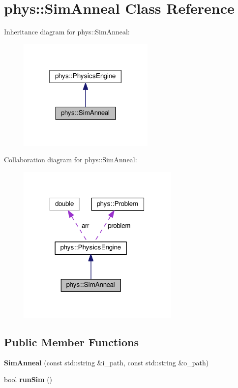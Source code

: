 \hypertarget{classphys_1_1SimAnneal}{}\section{phys\+:\+:Sim\+Anneal Class Reference}
\label{classphys_1_1SimAnneal}


Inheritance diagram for phys\+:\+:Sim\+Anneal\+:
\nopagebreak
\begin{figure}[H]
\begin{center}
\leavevmode
\includegraphics[width=189pt]{classphys_1_1SimAnneal__inherit__graph}
\end{center}
\end{figure}


Collaboration diagram for phys\+:\+:Sim\+Anneal\+:
\nopagebreak
\begin{figure}[H]
\begin{center}
\leavevmode
\includegraphics[width=224pt]{classphys_1_1SimAnneal__coll__graph}
\end{center}
\end{figure}
\subsection*{Public Member Functions}
\begin{DoxyCompactItemize}
\item 
{\bfseries Sim\+Anneal} (const std\+::string \&i\+\_\+path, const std\+::string \&o\+\_\+path)\hypertarget{classphys_1_1SimAnneal_a679a99fddc01c1605e680df21c0af57a}{}\label{classphys_1_1SimAnneal_a679a99fddc01c1605e680df21c0af57a}

\item 
bool {\bfseries run\+Sim} ()\hypertarget{classphys_1_1SimAnneal_ab18b3913b10a44aa3133be560894f03a}{}\label{classphys_1_1SimAnneal_ab18b3913b10a44aa3133be560894f03a}

\end{DoxyCompactItemize}
